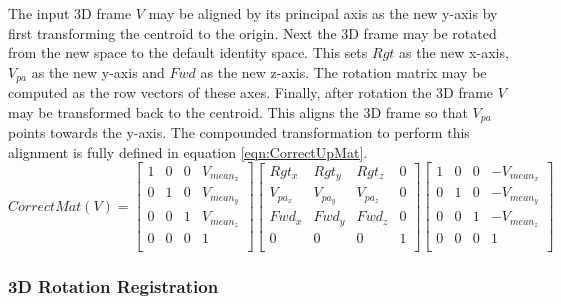 The input 3D frame $V$ may be aligned by its principal axis as the new y-axis by first transforming the centroid to the origin. Next the 3D frame may be rotated from the new space to the default identity space. This sets $Rgt$ as the new x-axis, $V_{pa}$ as the new y-axis and $Fwd$ as the new z-axis. The rotation matrix may be computed as the row vectors of these axes. Finally, after rotation the 3D frame $V$ may be transformed back to the centroid. This aligns the 3D frame so that $V_{pa}$ points towards the y-axis. The compounded transformation to perform this alignment is fully defined in equation \ref{eqn:CorrectUpMat}. \\

\begin{equation} \label{eqn:CorrectUpMat}
CorrectMat(V) = \left[
\begin{array}{cccc}
1 & 0 & 0 & V_{mean_x} \\
0 & 1 & 0 & V_{mean_y} \\
0 & 0 & 1 & V_{mean_z} \\
0 & 0 & 0 & 1 \\
\end{array}
\right] \left[
\begin{array}{cccc}
Rgt_x & Rgt_y & Rgt_z & 0 \\
V_{pa_x} & V_{pa_y} & V_{pa_z} & 0 \\
Fwd_x & Fwd_y & Fwd_z & 0 \\
0 & 0 & 0 & 1 \\
\end{array}
\right] \left[
\begin{array}{cccc}
1 & 0 & 0 & -V_{mean_x} \\
0 & 1 & 0 & -V_{mean_y} \\
0 & 0 & 1 & -V_{mean_z} \\
0 & 0 & 0 & 1 \\
\end{array}
\right]
\end{equation}

\subsubsection{3D Rotation Registration}

